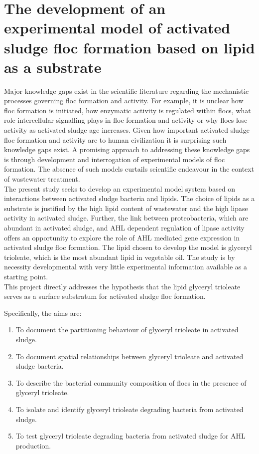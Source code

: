 \documentclass[twoside]{article}
\begin{document}
\section{The development of an experimental model of activated sludge floc formation based on lipid as a substrate}
\thispagestyle{plain}
Major knowledge gaps exist in the scientific literature regarding the mechanistic processes governing floc formation and activity. For example, it is unclear how floc formation is initiated, how enzymatic activity is regulated within flocs, what role intercellular signalling plays in floc formation and activity or why flocs lose activity as activated sludge age increases. Given how important activated sludge floc formation and activity are to human civilization it is surprising such knowledge gaps exist. A promising approach to addressing these knowledge gaps is through development and interrogation of experimental models of floc formation. The absence of such models curtails scientific endeavour in the context of wastewater treatment.  \\

The present study seeks to develop an experimental model system based on interactions between activated sludge bacteria and lipids. The choice of lipids as a substrate is justified by the high lipid content of wastewater and the high lipase activity in activated sludge. Further, the link between proteobacteria, which are abundant in activated sludge, and AHL dependent regulation of lipase activity offers an opportunity to explore the role of AHL mediated gene expression in activated sludge floc formation. The lipid chosen to develop the model is glyceryl trioleate, which is the most abundant lipid in vegetable oil. The study is by necessity developmental with very little experimental information available as a starting point.\\

This project directly addresses the hypothesis that the lipid glyceryl trioleate serves as a surface substratum for activated sludge floc formation. 


Specifically, the aims are:
\begin{enumerate}
\item To document the partitioning behaviour of glyceryl trioleate in activated sludge.
\item To document spatial relationships between glyceryl trioleate and activated sludge bacteria.
\item To describe the bacterial community composition of flocs in the presence of glyceryl trioleate.
\item To isolate and identify glyceryl trioleate degrading bacteria from activated sludge.

\item To test glyceryl trioleate degrading bacteria from activated sludge for AHL production.
\end{enumerate}
\newpage
\end{document}
